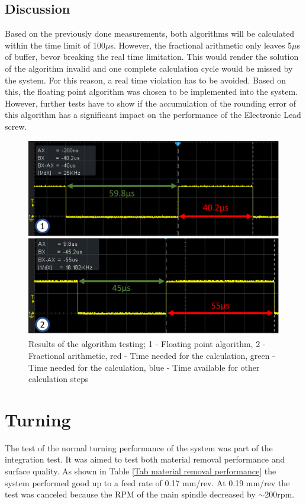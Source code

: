 \subsection{Discussion}
Based on the previously done measurements, both algorithms will be calculated within the time limit of 100$\mu$s. However, the fractional arithmetic only leaves 5$\mu$s of buffer, bevor breaking the real time limitation. This would render the solution of the algorithm invalid and one complete calculation cycle would be missed by the system. For this reason, a real time violation has to be avoided.
Based on this, the floating point algorithm was chosen to be implemented into the system. However, further tests have to show if the accumulation of the rounding error of this algorithm has a significant impact on the performance of the Electronic Lead screw.
 
\begin{figure}
    \begin{center}
    \includegraphics[width=12cm]{Pictures/ResArithmetic.png}
    \caption[Results of the algorithm testing]{Results of the algorithm testing; 1 - Floating point algorithm, 2 - Fractional arithmetic, red - Time needed for the calculation, green - Time needed for the calculation, blue - Time available for other calculation steps}
    \label{ResArithmetic}
    \end{center}
\end{figure}
 
 
\section{Turning}
The test of the normal turning performance of the system was part of the integration test. It was aimed to test both material removal performance and surface quality. As shown in Table \ref{Tab material removal performance} the system performed good up to a feed rate of 0.17 mm/rev. At 0.19 mm/rev the test was canceled because the RPM of the main spindle decreased by $\sim$200rpm.
 
